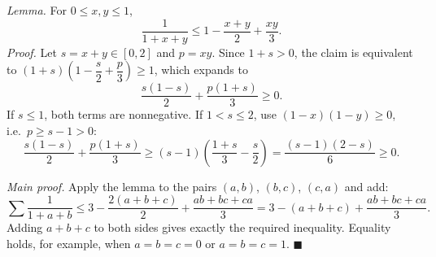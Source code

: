 \emph{Lemma.} For $0\le x,y\le1$,
\[
\dfrac{1}{1+x+y}\le1-\dfrac{x+y}{2}+\dfrac{xy}{3}.
\]
\emph{Proof.} Let $s=x+y\in[0,2]$ and $p=xy$. Since $1+s>0$, the claim is equivalent to $(1+s)\left(1-\dfrac {s}{2}+\dfrac {p}{3}\right)\ge1$, which expands to
\[
\dfrac{s(1-s)}{2}+\dfrac{p(1+s)}{3}\ge0 .
\]
If $s\le1$, both terms are nonnegative. If $1<s\le2$, use $(1-x)(1-y)\ge0$, i.e.\ $p\ge s-1>0$:
\[
\dfrac{s(1-s)}{2}+\dfrac{p(1+s)}{3}\ge(s-1)\left(\dfrac{1+s}{3}-\dfrac {s}{2}\right)=\dfrac{(s-1)(2-s)}{6}\ge0 .
\]

\emph{Main proof.} Apply the lemma to the pairs $(a,b)$, $(b,c)$, $(c,a)$ and add:
\[
\sum\dfrac{1}{1+a+b}\le3-\dfrac{2(a+b+c)}{2}+\dfrac{ab+bc+ca}{3}=3-(a+b+c)+\dfrac{ab+bc+ca}{3} .
\]
Adding $a+b+c$ to both sides gives exactly the required inequality. Equality holds, for example, when $a=b=c=0$ or $a=b=c=1$. $\blacksquare$

